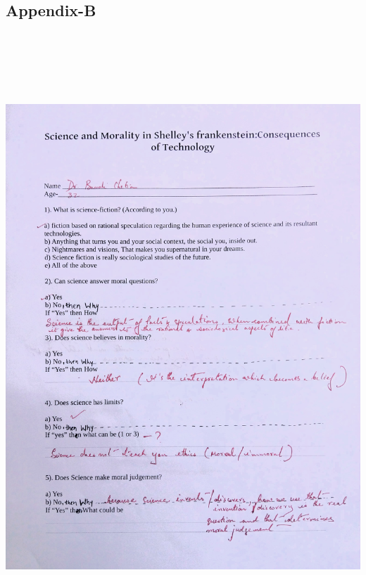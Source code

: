 \documentclass[12pt]{report}
\begin{document}
\subsection{Appendix-B}
\includegraphics[width=6in,height=9in]{a3.jpg}
\end{document}
